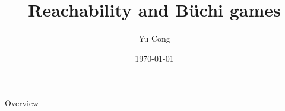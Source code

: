 \documentclass{beamer}
\author{Yu Cong}
\title{Reachability and Büchi games}
\date{\today}
\begin{document}
    \begin{frame}[plain]
        \titlepage
    \end{frame}

    \begin{frame}[plain]{Overview}
        \tableofcontents
    \end{frame}
    
\end{document}
